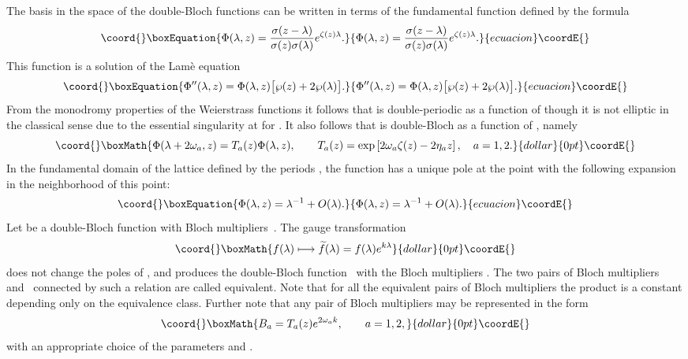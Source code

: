 \documentclass[a4paper,11pt]{article}
\providecommand{\wt}{\widetilde}
\theoremstyle{plain}
\theoremstyle{remark}
\begin{document}
The basis in the space of the double-Bloch functions can be written
in terms of the fundamental function \coordHE{} defined by
the formula
\begin{equation}\coord{}\boxEquation{\label{phi}
\Phi(\lambda,z)=\frac{\sigma(z-\lambda)}{\sigma(z)\sigma(\lambda)}
e^{\zeta(z)\lambda} .
}{\Phi(\lambda,z)=\frac{\sigma(z-\lambda)}{\sigma(z)\sigma(\lambda)}
e^{\zeta(z)\lambda} .
}{ecuacion}\coordE{}\end{equation}
This function is a solution of the Lam\`e equation
\begin{equation}\coord{}\boxEquation{
\Phi''(\lambda,z)=\Phi(\lambda,z) \bigl[ \wp(z)+2\wp(\lambda) \bigr] .
}{
\Phi''(\lambda,z)=\Phi(\lambda,z) \bigl[ \wp(z)+2\wp(\lambda) \bigr] .
}{ecuacion}\coordE{}\end{equation}
From the monodromy properties of the Weierstrass functions it follows
that \coordHE{} is double-periodic as a function of \coordHE{}
though it is not elliptic in the classical sense due to the essential
singularity at \coordHE{} for \coordHE{}. It also follows that
\coordHE{} is double-Bloch as a function of \myHighlight{$\lambda$}\coordHE{}, namely
$$\coord{}\boxMath{
\Phi(\lambda+2\omega_a,z)=T_a(z) \Phi(\lambda,z),\qquad
T_a(z)=\exp\left[ 2\omega_a\zeta(z)-2\eta_a z \right],\quad a=1,2.
}{dollar}{0pt}\coordE{}$$
In the fundamental domain of the lattice defined by the periods \coordHE{},
\coordHE{} the function \coordHE{} has a unique pole at the point
\coordHE{} with the following expansion in the neighborhood of this point:
\begin{equation}\coord{}\boxEquation{\label{phil}
\Phi(\lambda,z)=\lambda^{-1}+O(\lambda) .
}{\Phi(\lambda,z)=\lambda^{-1}+O(\lambda) .
}{ecuacion}\coordE{}\end{equation}
Let \coordHE{} be a double-Bloch function with Bloch multipliers~\coordHE{}.
The gauge transformation
$$\coord{}\boxMath{
f(\lambda)\longmapsto \wt f(\lambda)=f(\lambda) e^{k\lambda}
}{dollar}{0pt}\coordE{}$$
does not change the poles of \coordHE{}, and produces the double-Bloch
function~\myHighlight{$\wt f(\lambda)$}\coordHE{} with the Bloch multipliers
\myHighlight{$\wt{B_a}=B_a e^{2k \omega_a}$}\coordHE{}.
The two pairs of Bloch multipliers~\coordHE{} and~\myHighlight{$\wt{B_a}$}\coordHE{} connected by
such a relation are called equivalent. Note that for all the equivalent
pairs of Bloch multipliers the product \coordHE{}
is a constant depending only on the equivalence class.
Further note that any pair of Bloch multipliers may be represented in
the form
$$\coord{}\boxMath{
B_a=T_a(z) e^{2\omega_a k},\qquad a=1,2,
}{dollar}{0pt}\coordE{}$$
with an appropriate choice of the parameters \coordHE{} and \coordHE{}.
\end{document}
